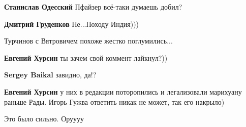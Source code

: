\begin{itemize}
\begin{itemize}
\textbf{Станислав Одесский} Пфайзер всё-таки думаешь добил?

 
\textbf{Дмитрий Груденков} Не...Походу Индия)))

 
Турчинов с Вятровичем похоже жестко поглумились...

 
\textbf{Евгений Хурсин} ты зачем свой коммент лайкнул?))

 
\textbf{Sergey Baikal} завидно, да!?

 
\textbf{Евгений Хурсин} у них в редакции поторопились и легализовали марихуану раньше Рады. Игорь Гужва ответить никак не может, так его накрыло)

 
Это было сильно. Оруууу

 

\end{itemize}
\end{itemize}
